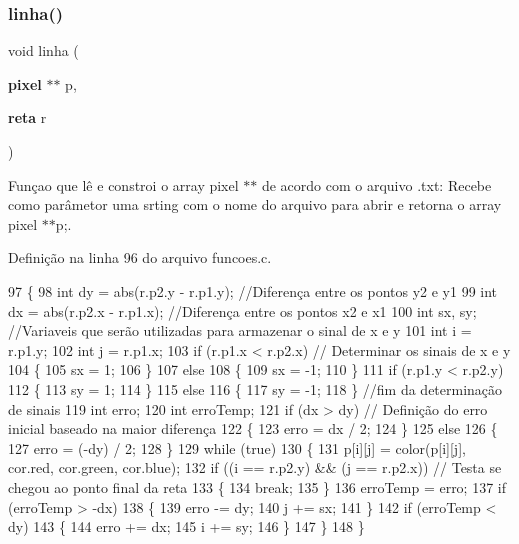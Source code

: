\subsubsection{linha()}
{\footnotesize\ttfamily void linha (\begin{DoxyParamCaption}\item[{\textbf{ pixel} $\ast$$\ast$}]{p,  }\item[{\textbf{ reta}}]{r }\end{DoxyParamCaption})}



Funçao que lê e constroi o array pixel $\ast$$\ast$ de acordo com o arquivo .txt\+: Recebe como parâmetor uma srting com o nome do arquivo para abrir e retorna o array pixel $\ast$$\ast$p;. 



Definição na linha 96 do arquivo funcoes.\+c.


\begin{DoxyCode}
97 \{                                  
98     \textcolor{keywordtype}{int} dy = abs(r.p2.y - r.p1.y); \textcolor{comment}{//Diferença entre os pontos y2 e y1}
99     \textcolor{keywordtype}{int} dx = abs(r.p2.x - r.p1.x); \textcolor{comment}{//Diferença entre os pontos x2 e x1}
100     \textcolor{keywordtype}{int} sx, sy;                    \textcolor{comment}{//Variaveis que serão utilizadas para armazenar o sinal de x e y}
101     \textcolor{keywordtype}{int} i = r.p1.y;
102     \textcolor{keywordtype}{int} j = r.p1.x;
103     \textcolor{keywordflow}{if} (r.p1.x < r.p2.x) \textcolor{comment}{// Determinar os sinais de x e y}
104     \{
105         sx = 1;
106     \}
107     \textcolor{keywordflow}{else}
108     \{
109         sx = -1;
110     \}
111     \textcolor{keywordflow}{if} (r.p1.y < r.p2.y)
112     \{
113         sy = 1;
114     \}
115     \textcolor{keywordflow}{else}
116     \{
117         sy = -1;
118     \} \textcolor{comment}{//fim da determinação de sinais}
119     \textcolor{keywordtype}{int} erro;
120     \textcolor{keywordtype}{int} erroTemp;
121     \textcolor{keywordflow}{if} (dx > dy) \textcolor{comment}{// Definição do erro inicial baseado na maior diferença}
122     \{
123         erro = dx / 2;
124     \}
125     \textcolor{keywordflow}{else}
126     \{
127         erro = (-dy) / 2;
128     \}
129     \textcolor{keywordflow}{while} (\textcolor{keyword}{true})
130     \{
131         p[i][j] = color(p[i][j], cor.red, cor.green, cor.blue);
132         \textcolor{keywordflow}{if} ((i == r.p2.y) && (j == r.p2.x))                     \textcolor{comment}{// Testa se chegou ao ponto final da reta}
133         \{
134             \textcolor{keywordflow}{break};
135         \}
136         erroTemp = erro;
137         \textcolor{keywordflow}{if} (erroTemp > -dx)
138         \{
139             erro -= dy;
140             j += sx;
141         \}
142         \textcolor{keywordflow}{if} (erroTemp < dy)
143         \{
144             erro += dx;
145             i += sy;
146         \}
147     \}
148 \}
\end{DoxyCode}
\mbox{\label{funcoes_8h_a0773218f17fe8125f5861385b65c709c}} 
